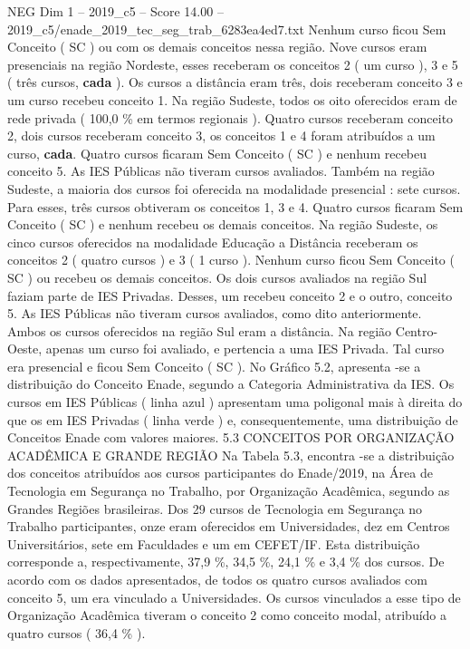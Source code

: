 \begin{textsample}{NEG Dim 1 – 2019\_c5 – Score 14.00 – 2019\_c5/enade\_2019\_tec\_seg\_trab\_6283ea4ed7.txt}
Nenhum curso ficou Sem Conceito ( SC ) ou com os demais conceitos nessa região.
Nove cursos eram presenciais na região Nordeste, esses receberam os conceitos 2 ( um curso ), 3 e 5 ( três cursos, \textbf{cada} ).
Os cursos a distância eram três, dois receberam conceito 3 e um curso recebeu conceito 1.
Na região Sudeste, todos os oito oferecidos eram de rede privada ( 100,0 \% em termos regionais ).
Quatro cursos receberam conceito 2, dois cursos receberam conceito 3, os conceitos 1 e 4 foram atribuídos a um curso, \textbf{cada}.
Quatro cursos ficaram Sem Conceito ( SC ) e nenhum recebeu conceito 5.
As IES Públicas não tiveram cursos avaliados.
Também na região Sudeste, a maioria dos cursos foi oferecida na modalidade presencial : sete cursos.
Para esses, três cursos obtiveram os conceitos 1, 3 e 4.
Quatro cursos ficaram Sem Conceito ( SC ) e nenhum recebeu os demais conceitos.
Na região Sudeste, os cinco cursos oferecidos na modalidade Educação a Distância receberam os conceitos 2 ( quatro cursos ) e 3 ( 1 curso ).
Nenhum curso ficou Sem Conceito ( SC ) ou recebeu os demais conceitos.
Os dois cursos avaliados na região Sul faziam parte de IES Privadas.
Desses, um recebeu conceito 2 e o outro, conceito 5.
As IES Públicas não tiveram cursos avaliados, como dito anteriormente.
Ambos os cursos oferecidos na região Sul eram a distância.
Na região Centro-Oeste, apenas um curso foi avaliado, e pertencia a uma IES Privada.
Tal curso era presencial e ficou Sem Conceito ( SC ).
No Gráfico 5.2, apresenta -se a distribuição do Conceito Enade, segundo a Categoria Administrativa da IES.
Os cursos em IES Públicas ( linha azul ) apresentam uma poligonal mais à direita do que os em IES Privadas ( linha verde ) e, consequentemente, uma distribuição de Conceitos Enade com valores maiores. 5.3 CONCEITOS POR ORGANIZAÇÃO ACADÊMICA E GRANDE REGIÃO Na Tabela 5.3, encontra -se a distribuição dos conceitos atribuídos aos cursos participantes do Enade/2019, na Área de Tecnologia em Segurança no Trabalho, por Organização Acadêmica, segundo as Grandes Regiões brasileiras.
Dos 29 cursos de Tecnologia em Segurança no Trabalho participantes, onze eram oferecidos em Universidades, dez em Centros Universitários, sete em Faculdades e um em CEFET/IF.
Esta distribuição corresponde a, respectivamente, 37,9 \%, 34,5 \%, 24,1 \% e 3,4 \% dos cursos.
De acordo com os dados apresentados, de todos os quatro cursos avaliados com conceito 5, um era vinculado a Universidades.
Os cursos vinculados a esse tipo de Organização Acadêmica tiveram o conceito 2 como conceito modal, atribuído a quatro cursos ( 36,4 \% ).

\end{textsample}
